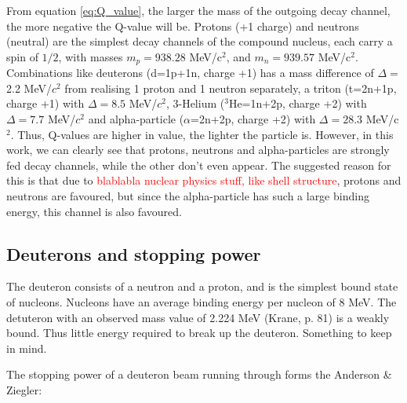 \documentclass[a4paper,11pt,twoside]{book}
\begin{document}
From equation \ref{eq:Q_value}, the larger the mass of the outgoing decay channel, the more negative the Q-value will be. Protons (+1 charge) and neutrons (neutral) are the simplest decay channels of the compound nucleus, each carry a spin of $1/2$, with masses $m_p=938.28$ MeV/c$^2$, and $m_n=939.57$ MeV/c$^2$. Combinations like deuterons (d=1p+1n, charge +1) has a mass difference of $\Delta=$2.2 MeV/$c^2$ from realising 1 proton and 1 neutron separately, a triton (t=2n+1p, charge +1) with $\Delta=8.5$ MeV/$c^2$,  3-Helium ($^{3}$He=1n+2p, charge +2) with $\Delta=7.7$ MeV/$c^2$ and alpha-particle ($\alpha$=2n+2p, charge +2) with $\Delta=28.3$ MeV/c$^2$. Thus, Q-values are higher in value, the lighter the particle is. However, in this work, we can clearly see that protons, neutrons and alpha-particles are strongly fed decay channels, while the other don't even appear. The suggested reason for this is that due to \textcolor{red}{blablabla nuclear physics stuff, like shell structure}, protons and neutrons are favoured, but since the alpha-particle has such a large binding energy, this channel is also favoured.  

\subsection{Deuterons and stopping power}

The deuteron consists of a neutron and a proton, and is the simplest bound state of nucleons. Nucleons have an average binding energy per nucleon of 8 MeV. The detuteron with an observed mass value of 2.224 MeV (Krane, p. 81) is a weakly bound. Thus little energy required to break up the deuteron. Something to keep in mind. 

The stopping power of a deuteron beam running through forms the Anderson \& Ziegler: 
\end{document}
